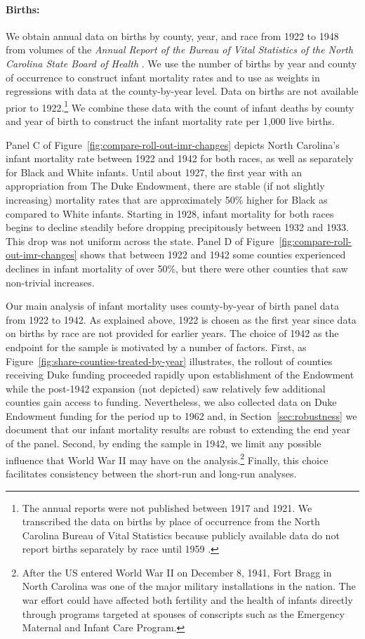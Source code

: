 \documentclass[12pt]{article}
\begin{document}
\paragraph{Births:} We obtain annual data on births by county, year, and race from 1922 to 1948 from volumes of the \textit{Annual Report of the Bureau of Vital Statistics of the North Carolina State Board of Health} .
We use the number of births by year and county of occurrence to construct infant mortality rates and to use as weights in regressions with data at the county-by-year level.
Data on births are not available prior to 1922.\footnote{The annual reports were not published between 1917 and 1921.
We transcribed the data on births by place of occurrence from the North Carolina Bureau of Vital Statistics because publicly available data do not report births separately by race until 1959 .
}
We combine these data with the count of infant deaths by county and year of birth to construct the infant mortality rate per 1,000 live births.

Panel C of Figure~\ref{fig:compare-roll-out-imr-changes} depicts North Carolina's infant mortality rate between 1922 and 1942 for both races, as well as separately for Black and White infants.
Until about 1927, the first year with an appropriation from The Duke Endowment, there are stable (if not slightly increasing) mortality rates that are approximately 50\% higher for Black as compared to White infants.
Starting in 1928, infant mortality for both races begins to decline steadily before dropping precipitously between 1932 and 1933.
This drop was not uniform across the state.
Panel D of Figure~\ref{fig:compare-roll-out-imr-changes} shows that between 1922 and 1942 some counties experienced declines in infant mortality of over 50\%, but there were other counties that saw non-trivial increases.

Our main analysis of infant mortality uses county-by-year of birth panel data from 1922 to 1942.
As explained above, 1922 is chosen as the first year since data on births by race are not provided for earlier years.
The choice of 1942 as the endpoint for the sample is motivated by a number of factors.
First, as Figure~\ref{fig:share-counties-treated-by-year} illustrates, the rollout of counties receiving Duke funding proceeded rapidly upon establishment of the Endowment while the post-1942 expansion (not depicted) saw relatively few additional counties gain access to funding.
Nevertheless, we also collected data on Duke Endowment funding for the period up to 1962 and, in Section~\ref{sec:robustness} we document that our infant mortality results are robust to extending the end year of the panel.
Second, by ending the sample in 1942, we limit any possible influence that World War II may have on the analysis.\footnote{
After the US entered World War II on December 8, 1941, Fort Bragg in North Carolina was one of the major military installations in the nation.
The war effort could have affected both fertility and the health of infants directly through programs targeted at spouses of conscripts such as the Emergency Maternal and Infant Care Program.
}
Finally, this choice facilitates consistency between the short-run and long-run analyses.
\end{document}
